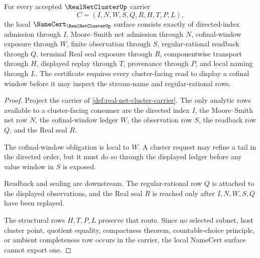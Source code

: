 \begin{theorem}
\label{thm:real-net-cluster-namecert-obligations}
For every accepted $\RealNetClusterUp$ carrier
$$
C=(I,N,W,S,Q,R,H,T,P,L),
$$
the local $\NameCert_{\RealNetClusterUp}$ surface consists exactly of directed-index admission through $I$, Moore--Smith net admission through $N$, cofinal-window exposure through $W$, finite observation through $S$, regular-rational readback through $Q$, terminal Real seal exposure through $R$, componentwise transport through $H$, displayed replay through $T$, provenance through $P$, and local naming through $L$. The certificate requires every cluster-facing read to display a cofinal window before it may inspect the stream-name and regular-rational rows.
\end{theorem}
\begin{proof}
Project the carrier of \autoref{def:real-net-cluster-carrier}. The only analytic rows available to a cluster-facing consumer are the directed index $I$, the Moore--Smith net row $N$, the cofinal-window ledger $W$, the observation row $S$, the readback row $Q$, and the Real seal $R$.

The cofinal-window obligation is local to $W$. A cluster request may refine a tail in the directed order, but it must do so through the displayed ledger before any value window in $S$ is exposed.

Readback and sealing are downstream. The regular-rational row $Q$ is attached to the displayed observations, and the Real seal $R$ is reached only after $I,N,W,S,Q$ have been replayed.

The structural rows $H,T,P,L$ preserve that route. Since no selected subnet, host cluster point, quotient equality, compactness theorem, countable-choice principle, or ambient completeness row occurs in the carrier, the local NameCert surface cannot export one.
\end{proof}

